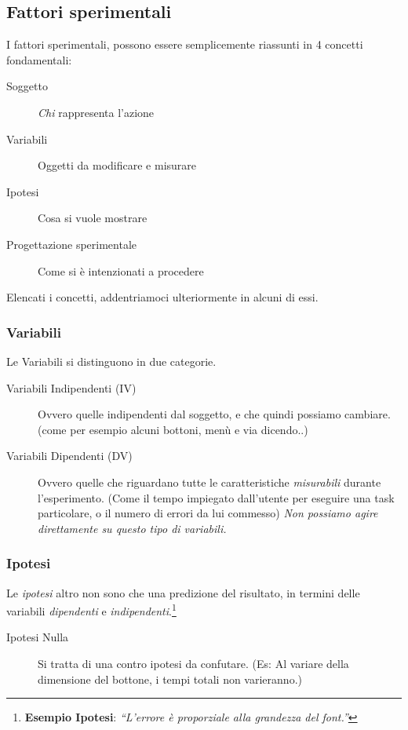 \documentclass[oneside]{book}
\begin{document}
		\subsection{Fattori sperimentali}
			I fattori sperimentali, possono essere semplicemente riassunti in 4 concetti fondamentali:
			\begin{description}
			\item[Soggetto] \emph{Chi} rappresenta l'azione
			\item[Variabili] Oggetti da modificare e misurare
			\item[Ipotesi] Cosa si vuole mostrare
			\item[Progettazione sperimentale] Come si è intenzionati a procedere
			\end{description}
			Elencati i concetti, addentriamoci ulteriormente in alcuni di essi.

			\subsubsection{Variabili}
				Le Variabili si distinguono in due categorie.
				\begin{description}
				\item[Variabili Indipendenti (IV)] Ovvero quelle indipendenti dal soggetto, e che quindi possiamo cambiare. (come per esempio alcuni bottoni, menù e via dicendo..)
				\item[Variabili Dipendenti (DV)] Ovvero quelle che riguardano tutte le caratteristiche \emph{misurabili} durante l'esperimento. (Come il tempo impiegato dall'utente per eseguire una task particolare, o il numero di errori da lui commesso) \emph{Non possiamo agire direttamente su questo tipo di variabili.}
				\end{description}

			\subsubsection{Ipotesi}
				Le \emph{ipotesi} altro non sono che una predizione del risultato, in termini delle variabili \emph{dipendenti} e \emph{indipendenti}.\footnote{ \textbf{Esempio Ipotesi}: \emph{``L'errore è proporziale alla grandezza del font.''}} 
				\begin{description}
				\item[Ipotesi Nulla] Si tratta di una contro ipotesi da confutare. (Es: Al variare della dimensione del bottone, i tempi totali non varieranno.)
				\end{description}
\end{document}
